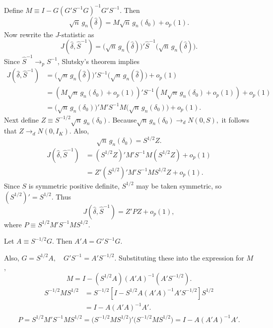 \documentclass[12pt, letterpaper, onecolumn]{exam}
\begin{document}
\begin{solution}
    Define $M \equiv I-G(G'S^{-1}G)^{-1}G'S^{-1}.$
    Then
    $$
        \sqrt n\,g_n(\hat\delta)=M\sqrt n\,g_n(\delta_0)+o_p(1).
    $$
    Now rewrite the \(J\)-statistic as
    $$
        J(\hat\delta,\hat S^{-1})
        =
        \bigl(\sqrt n\,g_n(\hat\delta)\bigr)'\hat S^{-1}\bigl(\sqrt n\,g_n(\hat\delta)\bigr).
    $$
    Since \(\hat S^{-1}\to_p S^{-1}\), Slutsky's theorem implies
    \begin{align*}
        J(\hat\delta,\hat S^{-1})
         & =
        \bigl(\sqrt n\,g_n(\hat\delta)\bigr)'S^{-1}\bigl(\sqrt n\,g_n(\hat\delta)\bigr)+o_p(1) \\
         & =
        \left(M\sqrt n\,g_n(\delta_0)+o_p(1)\right)'
        S^{-1}
        \left(M\sqrt n\,g_n(\delta_0)+o_p(1)\right)
        +o_p(1)                                                                                \\
         & =
        \bigl(\sqrt n\,g_n(\delta_0)\bigr)'M'S^{-1}M\bigl(\sqrt n\,g_n(\delta_0)\bigr)+o_p(1).
    \end{align*}
    Next define $Z\equiv S^{-1/2}\sqrt n\,g_n(\delta_0).$ Because$\sqrt n\,g_n(\delta_0)\to_d N(0,S),$ it follows that $Z\to_d N(0,I_K).$
    Also,
    $$
        \sqrt n\,g_n(\delta_0)=S^{1/2}Z.
    $$
    \begin{align*}
        J(\hat\delta,\hat S^{-1})
         & =
        (S^{1/2}Z)'M'S^{-1}M(S^{1/2}Z)+o_p(1) \\
         & =
        Z'(S^{1/2})'M'S^{-1}MS^{1/2}Z+o_p(1).
    \end{align*}
    Since \(S\) is symmetric positive definite, \(S^{1/2}\) may be taken symmetric, so \((S^{1/2})'=S^{1/2}\). Thus
    $$
        J(\hat\delta,\hat S^{-1})
        =
        Z'PZ+o_p(1),
    $$
    where $P\equiv S^{1/2}M'S^{-1}MS^{1/2}.$

    Let $A\equiv S^{-1/2}G.$ Then $A'A=G'S^{-1}G.$

    Also, $G=S^{1/2}A,\quad G'S^{-1}=A'S^{-1/2}.$
    Substituting these into the expression for \(M\),
    $$M=I-(S^{1/2}A)(A'A)^{-1}(A'S^{-1/2}).$$
    \begin{align*}
        S^{-1/2}MS^{1/2}
         & =
        S^{-1/2}
        \left[
        I-S^{1/2}A(A'A)^{-1}A'S^{-1/2}
        \right]
        S^{1/2} \\
         & =
        I-A(A'A)^{-1}A'.
    \end{align*}
    \begin{align*}
        P=S^{1/2}M'S^{-1}MS^{1/2}=
        \bigl(S^{-1/2}MS^{1/2}\bigr)'\bigl(S^{-1/2}MS^{1/2}\bigr)=I-A(A'A)^{-1}A'.
    \end{align*}


\end{solution}
\end{document}
